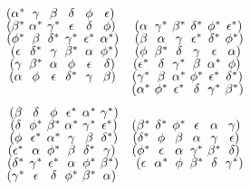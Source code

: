 \documentclass[notitlepage, 10pt]{article}
\begin{document}
\begin{prop}
\begin{equation}
{        }
        \quad
        \tightsextuple{
            (\alpha ^* & \gamma  & \beta  & \delta  & \phi  & \epsilon )\\
            (\beta ^* & \alpha ^* & \gamma ^* & \epsilon  & \delta  & \phi )\\
            (\phi ^* & \beta  & \delta ^* & \gamma ^* & \epsilon ^* & \alpha ^*)\\
            (\epsilon  & \delta ^* & \gamma  & \beta ^* & \alpha  & \phi ^*)\\
            (\gamma  & \beta ^* & \alpha  & \phi  & \epsilon  & \delta )\\
            (\alpha  & \phi  & \epsilon  & \delta ^* & \gamma  & \beta )\\[2em]
            (\beta  & \delta  & \phi  & \epsilon^* & \alpha^* & \gamma^*)\\
            (\delta  & \phi^* & \beta^* & \alpha^* & \gamma^* & \epsilon^*)\\
            (\phi  & \epsilon^* & \alpha^* & \gamma  & \beta  & \delta^*)\\
            (\epsilon^* & \alpha  & \phi^* & \beta  & \delta^* & \gamma )\\
            (\delta^* & \gamma^* & \epsilon^* & \alpha  & \phi^* & \beta^*)\\
            (\gamma^* & \epsilon  & \delta  & \phi^* & \beta^* & \alpha )\\
        }
        \quad
        \tightsextuple{
            (\alpha  & \gamma ^* & \beta ^* & \delta ^* & \phi ^* & \epsilon ^*)\\
            (\beta  & \alpha  & \gamma  & \epsilon ^* & \delta ^* & \phi ^*)\\
            (\phi  & \beta ^* & \delta  & \gamma  & \epsilon  & \alpha )\\
            (\epsilon ^* & \delta  & \gamma ^* & \beta  & \alpha ^* & \phi )\\
            (\gamma ^* & \beta  & \alpha ^* & \phi ^* & \epsilon ^* & \delta ^*)\\
            (\alpha ^* & \phi ^* & \epsilon ^* & \delta  & \gamma ^* & \beta ^*)\\[2em]
            (\beta^* & \delta^* & \phi^* & \epsilon  & \alpha  & \gamma )\\
            (\delta^* & \phi  & \beta  & \alpha  & \gamma  & \epsilon )\\
            (\phi^* & \epsilon  & \alpha  & \gamma^* & \beta^* & \delta )\\
            (\epsilon  & \alpha^* & \phi  & \beta^* & \delta  & \gamma^*)\\
}
\end{equation}
\end{prop}
\end{document}
